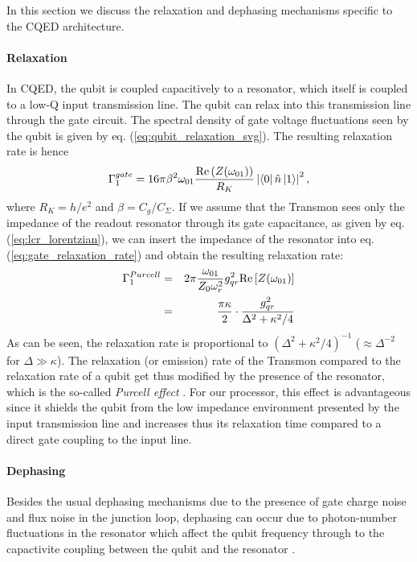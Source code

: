 In this section we discuss the relaxation and dephasing mechanisms specific to the CQED architecture.

\paragraph{Relaxation}

In CQED, the qubit is coupled capacitively to a resonator, which itself is coupled to a low-Q input transmission line. The qubit can relax into this transmission line through the gate circuit. The spectral density of gate voltage fluctuations seen by the qubit is given by eq. (\ref{eq:qubit_relaxation_svg}). The resulting relaxation rate is hence
%
\begin{equation}
\Gamma_1^{gate} = 16\pi\beta^2 \omega_{01} \frac{\mathrm{Re}\left(Z(\omega_{01})\right)}{R_K}\left|\left< 0 \right|\hat{n}\left| 1 \right>\right|^2, \label{eq:gate_relaxation_rate}
\end{equation}
%
where $R_K = h/e^2$ and $\beta=C_g/C_\Sigma$. If we assume that the Transmon sees only the impedance of the readout resonator through its gate capacitance, as given by eq. (\ref{eq:lcr_lorentzian}), we can insert the impedance of the resonator into eq. (\ref{eq:gate_relaxation_rate}) and obtain the resulting relaxation rate:
%
\begin{eqnarray}
\Gamma_1^{Purcell} & = & 2\pi\frac{\omega_{01}}{Z_0 \omega_r^2}g_{qr}^2 \mathrm{Re}\left[Z(\omega_{01})\right] \notag \\
                & = & \frac{\pi\kappa}{2}\cdot\frac{g_{qr}^2}{\Delta^2+\kappa^2/4} \label{eq:purcell_rate}
\end{eqnarray}
%
As can be seen, the relaxation rate is proportional to $(\Delta^2+\kappa^2/4)^{-1}$ ($\approx\Delta^{-2}$ for $\Delta \gg \kappa$). The relaxation (or emission) rate of the Transmon compared to the relaxation rate of a qubit get thus modified by the presence of the resonator, which is the so-called {\it Purcell effect} \citep{purcell_spontaneous_1946}. For our processor, this effect is advantageous since it shields the qubit from the low impedance environment presented by the input transmission line and increases thus its relaxation time compared to a direct gate coupling to the input line.

\paragraph{Dephasing} Besides the usual dephasing mechanisms due to the presence of gate charge noise and flux noise in the junction loop, dephasing can occur due to photon-number fluctuations in the resonator which affect the qubit frequency through to the capactivite coupling between the qubit and the resonator \citep{bertet_dephasing_2005,bertet_dephasing_2005-1,rigetti_superconducting_2012}.

